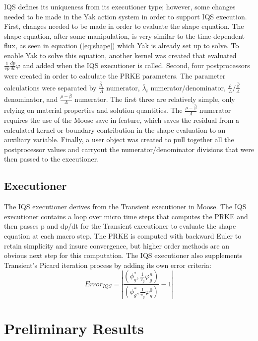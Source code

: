 \documentclass[11pt]{scrartcl}
\newcommand{\be}{\begin{equation}}
\newcommand{\ee}{\end{equation}}
\begin{document}
IQS defines its uniqueness from its executioner type; however, some changes needed to be made in the Yak action system in order to support IQS execution.   First, changes needed to be made in order to evaluate the shape equation.  The shape equation, after some manipulation, is very similar to the time-dependent flux, as seen in equation (\ref{eq:shape}) which Yak is already set up to solve.  To enable Yak to solve this equation, another kernel was created that evaluated $\frac{1}{vp}\frac{dp}{dt}\varphi$ and added when the IQS executioner is called.  Second, four postprocessors were created in order to calculate the PRKE parameters.  The parameter calculations were separated by $\frac{\bar{\beta}_i}{\Lambda}$ numerator, $\bar{\lambda}_i$ numerator/denominator, $\frac{\rho}{\Lambda}/\frac{\bar{\beta}}{\Lambda}$ denominator, and $\frac{\rho-\bar{\beta}}{\Lambda}$ numerator.  The first three are relatively simple, only relying on material properties and solution quantities.  The $\frac{\rho-\bar{\beta}}{\Lambda}$ numerator requires the use of the Moose save in feature, which saves the residual from a calculated kernel or boundary contribution in the shape evaluation to an auxiliary variable.  Finally, a user object was created to pull together all the postprocessor values and carryout the numerator/denominator divisions that were then passed to the executioner.

\subsection{Executioner}

The IQS executioner derives from the Transient executioner in Moose.  The IQS executioner contains a loop over micro time steps that computes the PRKE and then passes p and dp/dt for the Transient executioner to evaluate the shape equation at each macro step.  The PRKE is computed with backward Euler to retain simplicity and insure convergence, but higher order methods are an obvious next step for this computation.   The IQS executioner also supplements Transient’s Picard iteration process by adding its own error criteria: 
\be
Error_{IQS}=\left|\frac{\left(\phi^*_g,\frac{1}{v_g}\varphi_g^n\right)}{\left(\phi_g^*,\frac{1}{v_g}\varphi_g^0\right)}-1\right|
\ee

\section{Preliminary Results}
\end{document}
